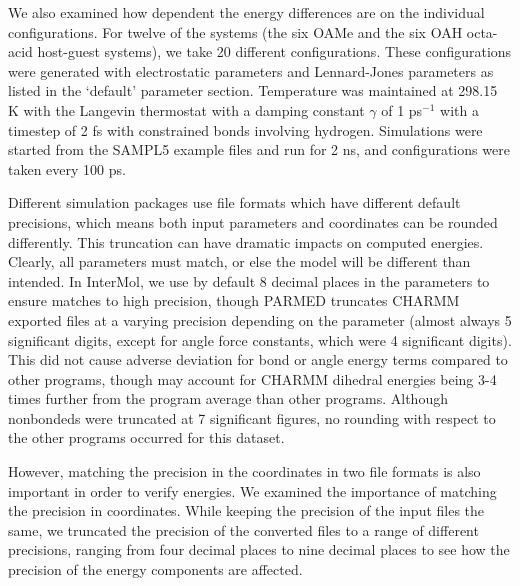 We also examined how dependent the energy differences are on the
individual configurations. For twelve of the systems (the six OAMe and
the six OAH octa-acid host-guest systems), we take 20 different
configurations. These configurations were generated with electrostatic
parameters and Lennard-Jones parameters as listed in the `default'
parameter section. Temperature was maintained at 298.15 K with the
Langevin thermostat with a damping constant $\gamma$ of 1 ps$^{-1}$
with a timestep of 2 fs with constrained bonds involving
hydrogen. Simulations were started from the SAMPL5 example files and
run for 2 ns, and configurations were taken every 100 ps.

Different simulation packages use file formats which have different
default precisions, which means both input parameters and coordinates
can be rounded differently. This truncation can have dramatic impacts
on computed energies. Clearly, all parameters must match, or else the
model will be different than intended. In InterMol, we use by default
8 decimal places in the parameters to ensure matches to high
precision, though PARMED truncates CHARMM exported files at a varying
precision depending on the parameter (almost always 5 significant
digits, except for angle force constants, which were 4 significant
digits). This did not cause adverse deviation for bond or angle energy
terms compared to other programs, though may account for CHARMM
dihedral energies being 3-4 times further from the program average
than other programs. Although nonbondeds were truncated at 7
significant figures, no rounding with respect to the other programs
occurred for this dataset.

However, matching the precision in the coordinates in two file formats
is also important in order to verify energies. We examined the
importance of matching the precision in coordinates.  While keeping
the precision of the input files the same, we truncated the precision
of the converted files to a range of different precisions, ranging
from four decimal places to nine decimal places to see how the
precision of the energy components are affected.
 

